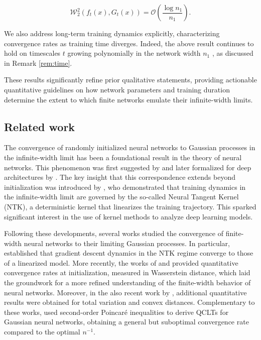 \documentclass{article}
\theoremstyle{definition}
\theoremstyle{remark}
\numberwithin{equation}{section}
\begin{document}
\[
    \mathcal W_2^2(f_t(x),G_t(x)) = \mathcal O\left(\frac{\log n_1}{n_1}\right).
\]

We also address long-term training dynamics explicitly, characterizing convergence rates as training time diverges. 
Indeed, the above result continues to hold on timescales $t$ growing polynomially in the network width $n_1$ , 
as discussed in Remark \ref{rem:time}.

These results significantly refine prior qualitative statements, 
providing actionable quantitative guidelines on how network parameters and training duration determine the extent to which finite networks emulate their infinite-width limits.

\subsection{Related work}

The convergence of randomly initialized neural networks to Gaussian processes in the infinite-width limit has been a foundational result in the theory of neural networks. 
This phenomenon was first suggested by \cite{neal96} and later formalized for deep architectures by \cite{Matthews2018GaussianPB}.
The key insight that this correspondence extends beyond initialization was introduced by \cite{jacot}, 
who demonstrated that training dynamics in the infinite-width limit are governed by the so-called Neural Tangent Kernel (NTK), 
a deterministic kernel that linearizes the training trajectory. 
This sparked significant interest in the use of kernel methods to analyze deep learning models.

Following these developments, several works studied the convergence of finite-width neural networks to their limiting Gaussian processes. 
In particular, \cite{Lee2020} established that gradient descent dynamics in the NTK regime converge to those of a linearized model. 
More recently, the works of \cite{BasteriTrevisan2023} and \cite{trevisan2023wide} provided quantitative convergence rates at initialization, 
measured in Wasserstein distance, which laid the groundwork for a more refined understanding of the finite-width behavior of neural networks. 
Moreover, in the also recent work by \cite{Favaro2025}, additional quantitative results were obtained for total variation and convex distances.
Complementary to these works, \cite{bordino2025} used second-order Poincaré inequalities to derive QCLTs for Gaussian neural networks, 
obtaining a general but suboptimal convergence rate compared to the optimal $n^{-1}$.
\end{document}
